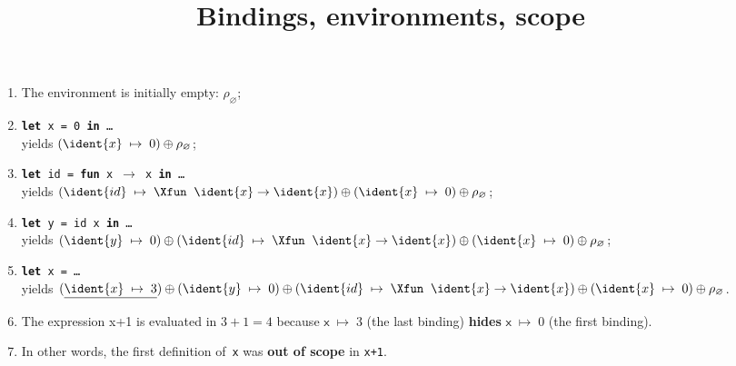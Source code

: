 \documentclass[wide]{slides}
\begin{document}
\begin{slide}
  \title{Bindings, environments, scope}

  \begin{enumerate}

    \item The environment is initially empty: \(\rho_\varnothing\);

    \item \texttt{\textbf{let} x = 0 \textbf{in} \ldots}\\ yields
      $(\ident{x} \;\mapsto\; 0) \oplus \rho_\varnothing$;

    \item \texttt{\textbf{let} id = \textbf{fun} x $\rightarrow$ x
      \textbf{in} \ldots}\\ yields $(\ident{id} \; \mapsto \; \Xfun
      \;\; \ident{x} \rightarrow \ident{x}) \oplus (\ident{x} \;
      \mapsto \; 0) \oplus \rho_\varnothing$;

    \item \texttt{\textbf{let} y = id x \textbf{in} \ldots}\\ yields
      $(\ident{y} \; \mapsto \; 0) \oplus (\ident{id} \; \mapsto \;
      \Xfun \;\; \ident{x} \rightarrow \ident{x}) \oplus (\ident{x} \;
      \mapsto \; 0) \oplus \rho_\varnothing$;

    \item \texttt{\textbf{let} x = \ldots}\\ yields
      $(\underline{\ident{x} \; \mapsto \; 3}) \oplus (\ident{y} \;
      \mapsto \; 0) \oplus (\ident{id} \; \mapsto \; \Xfun \;\;
      \ident{x} \rightarrow \ident{x}) \oplus (\ident{x} \; \mapsto \;
      0) \oplus \rho_\varnothing$.

    \item The expression \textsf{x+1} is evaluated in \(3+1=4\)
      because \(\textsf{x} \; \mapsto \; 3\) (the last binding)
      \textbf{hides} \(\textsf{x} \; \mapsto \; 0\) (the first
      binding).

    \item In other words, the first definition of~\texttt{x} was
      \textbf{out of scope} in \texttt{x+1}.

  \end{enumerate}

\end{slide}
\end{document}
